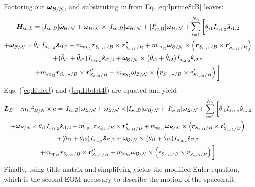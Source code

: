 \documentclass[paper]{aiaaNew}
\begin{document}
	Factoring out $\bm\omega_{\cal B/N}$, and substituting in from Eq. \ref{eq:IprimeScB} leaves:	
	\begin{multline}
	\dot{\bm{H}}_{\text{sc},B} = [I_{\text{sc},B}] \dot{\bm\omega}_{\cal B/N} + \bm\omega_{\cal B/N} \times [I_{\text{sc},B}] \bm\omega_{\cal B/N} + [I'_{\text{sc},B}] \bm\omega_{\cal B/N}
	 +  \sum\limits_{i=1}^{N_S} \bigg[ \ddot{\theta}_{i1} I_{s_{i1,2}}\bm{\hat{s}}_{i1,2}\\
	+ \bm\omega_{\cal B/N} \times \dot{\theta}_{i1} I_{s_{i1,2}}\bm{\hat{s}}_{i1,2} 
	+m_{\text{sp}_{i1}} \bm{r}_{S_{c,i1}/B} \times \bm{r}''_{S_{c,i1}/B}
	 +m_{\text{sp}_{i1}} \bm\omega_{\cal B/N} \times \left(\bm{r}_{S_{c,i1}/B} \times \bm{r}'_{S_{c,i1}/B}\right)\\
	  +\big(\ddot{\theta}_{i1}+\ddot{\theta}_{i2}\big) I_{s_{i2,2}}\bm{\hat{s}}_{i2,2}
	 + \bm\omega_{\cal B/N} \times \big(\dot{\theta}_{i1}+\dot{\theta}_{i2}\big) I_{s_{i2,2}}\bm{\hat{s}}_{i2,2} \\
	 +m_{\text{sp}_{i2}} \bm{r}_{S_{c,i2}/B} \times \bm{r}''_{S_{c,i2}/B}
	 +m_{\text{sp}_{i2}} \bm\omega_{\cal B/N} \times \left(\bm{r}_{S_{c,i2}/B} \times \bm{r}'_{S_{c,i2}/B}\right)\bigg]
	\label{eq:Hbdot4}
	\end{multline}
	Eqs. (\ref{eq:Euler}) and (\ref{eq:Hbdot4}) are equated and yield
	\begin{multline}
	\bm{L}_B+m_{\text{sc}}\ddot{\bm r}_{B/N}\times\bm{c} = [I_{\text{sc},B}] \dot{\bm\omega}_{\cal B/N} + \bm\omega_{\cal B/N} \times [I_{\text{sc},B}] \bm\omega_{\cal B/N} + [I'_{\text{sc},B}] \bm\omega_{\cal B/N} 
	+  \sum\limits_{i=1}^{N_S} \bigg[ \ddot{\theta}_{i1} I_{s_{i1,2}}\bm{\hat{s}}_{i1,2}\\
	+ \bm\omega_{\cal B/N} \times \dot{\theta}_{i1} I_{s_{i1,2}}\bm{\hat{s}}_{i1,2} 
	+m_{\text{sp}_{i1}} \bm{r}_{S_{c,i1}/B} \times \bm{r}''_{S_{c,i1}/B}
	+m_{\text{sp}_{i1}} \bm\omega_{\cal B/N} \times \left(\bm{r}_{S_{c,i1}/B} \times \bm{r}'_{S_{c,i1}/B}\right)\\
	+\big(\ddot{\theta}_{i1}+\ddot{\theta}_{i2}\big) I_{s_{i2,2}}\bm{\hat{s}}_{i2,2}
	+ \bm\omega_{\cal B/N} \times \big(\dot{\theta}_{i1}+\dot{\theta}_{i2}\big) I_{s_{i2,2}}\bm{\hat{s}}_{i2,2} \\
	+m_{\text{sp}_{i2}} \bm{r}_{S_{c,i2}/B} \times \bm{r}''_{S_{c,i2}/B}
	+m_{\text{sp}_{i2}} \bm\omega_{\cal B/N} \times \left(\bm{r}_{S_{c,i2}/B} \times \bm{r}'_{S_{c,i2}/B}\right)\bigg]
	\label{eq:Hbdot5}
	\end{multline}
	Finally, using tilde matrix and simplifying yields the modified Euler equation, which is the second EOM necessary to describe the motion of the spacecraft.
\end{document}

